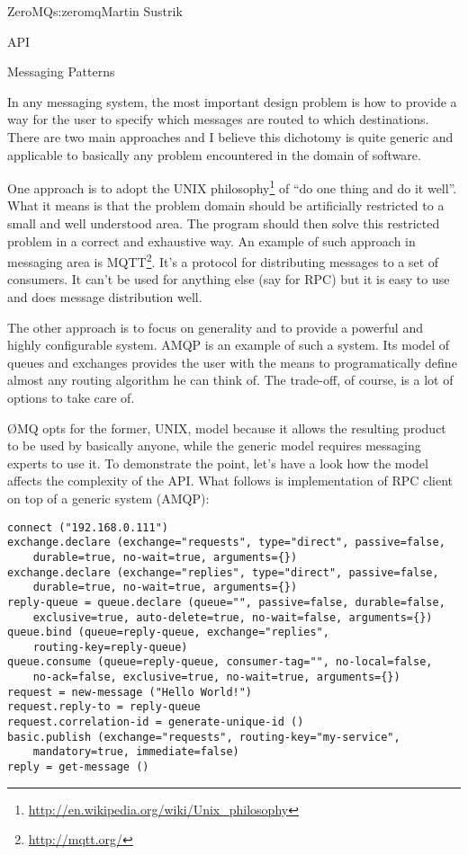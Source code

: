 \begin{aosachapter}{ZeroMQ}{s:zeromq}{Martin Sustrik}
\begin{aosasect1}{API}
\end{aosasect1}

\begin{aosasect1}{Messaging Patterns}

In any messaging system, the most important design problem is how to
provide a way for the user to specify which messages are routed to
which destinations.  There are two main approaches and I believe this
dichotomy is quite generic and applicable to basically any problem
encountered in the domain of software.

One approach is to adopt the UNIX
philosophy\footnote{\url{http://en.wikipedia.org/wiki/Unix_philosophy}}
of ``do one thing and do it well''. What it means is that the problem
domain should be artificially restricted to a small and well
understood area. The program should then solve this restricted problem
in a correct and exhaustive way. An example of such approach in
messaging area is MQTT\footnote{\url{http://mqtt.org/}}. It's a
protocol for distributing messages to a set of consumers. It can't be
used for anything else (say for RPC) but it is easy to use and does
message distribution well.

The other approach is to focus on generality and to provide a powerful
and highly configurable system. AMQP is an example of such a
system. Its model of queues and exchanges provides the user with the
means to programatically define almost any routing algorithm he can
think of. The trade-off, of course, is a lot of options to take care
of.

{\O}MQ opts for the former, UNIX, model because it allows the resulting
product to be used by basically anyone, while the generic model
requires messaging experts to use it. To demonstrate the point, let's
have a look how the model affects the complexity of the API. What
follows is implementation of RPC client on top of a generic system
(AMQP):

\begin{verbatim}
connect ("192.168.0.111")
exchange.declare (exchange="requests", type="direct", passive=false,
    durable=true, no-wait=true, arguments={})
exchange.declare (exchange="replies", type="direct", passive=false,
    durable=true, no-wait=true, arguments={})
reply-queue = queue.declare (queue="", passive=false, durable=false,
    exclusive=true, auto-delete=true, no-wait=false, arguments={})
queue.bind (queue=reply-queue, exchange="replies",
    routing-key=reply-queue)
queue.consume (queue=reply-queue, consumer-tag="", no-local=false,
    no-ack=false, exclusive=true, no-wait=true, arguments={})
request = new-message ("Hello World!")
request.reply-to = reply-queue
request.correlation-id = generate-unique-id ()
basic.publish (exchange="requests", routing-key="my-service",
    mandatory=true, immediate=false)
reply = get-message ()
\end{verbatim}


\end{aosasect1}
\end{aosachapter}
